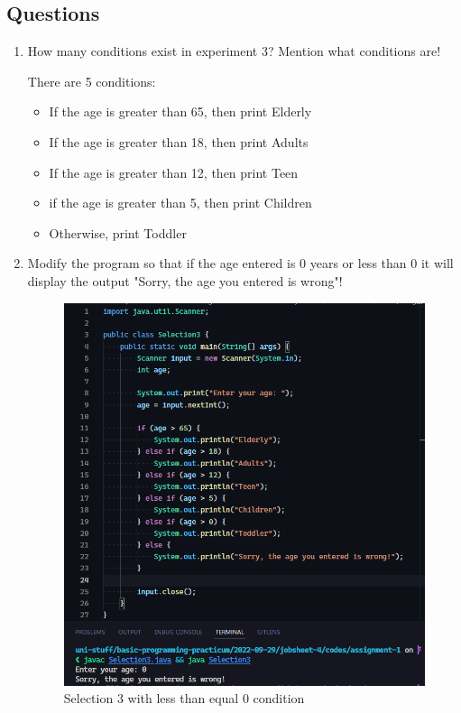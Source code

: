 \documentclass[12pt,titlepage]{article}
\begin{document}
\subsection*{Questions}
\begin{enumerate}
    \item {
        How many conditions exist in experiment 3? Mention what conditions are!

        There are 5 conditions:
        \begin{itemize}
            \item If the age is greater than 65, then print Elderly
            \item If the age is greater than 18, then print Adults
            \item If the age is greater than 12, then print Teen
            \item if the age is greater than 5, then print Children
            \item Otherwise, print Toddler
        \end{itemize}
    }
    \item {
        Modify the program so that if the age entered is 0 years or less than 0 it will display the output "Sorry, the age you entered is wrong"!

        \begin{figure}[h]
            \centering
            \includegraphics[width=.8\textwidth]{./images/selection-3-zero.png}
            \caption{Selection 3 with less than equal 0 condition}
        \end{figure}
    }
\end{enumerate}
\end{document}
